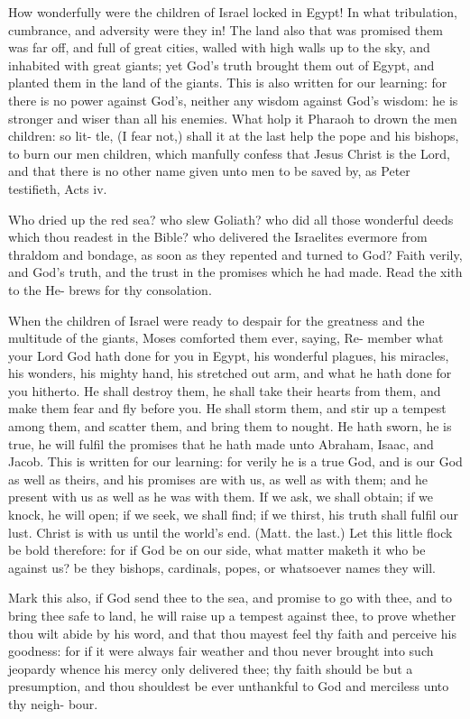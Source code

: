 \documentclass{custom}
\begin{document}
How wonderfully were the children of Israel 
locked in Egypt! In what tribulation, cumbrance, 
and adversity were they in! The land also that 
was promised them was far off, and full of great 
cities, walled with high walls up to the sky, and 
inhabited with great giants; yet God's truth 
brought them out of Egypt, and planted them in 
the land of the giants. This is also written for 
our learning: for there is no power against God's,
neither any wisdom against God's wisdom: he is 
stronger and wiser than all his enemies. What 
holp it Pharaoh to drown the men children: so lit-
tle, (I fear not,) shall it at the last help the pope 
and his bishops, to burn our men children, 
which manfully confess that Jesus Christ is the 
Lord, and that there is no other name given unto 
men to be saved by, as Peter testifieth, Acts iv. 

Who dried up the red sea? who slew Goliath? 
who did all those wonderful deeds which thou 
readest in the Bible? who delivered the Israelites 
evermore from thraldom and bondage, as soon as 
they repented and turned to God? Faith verily, 
and God's truth, and the trust in the promises 
which he had made. Read the xith to the He- 
brews for thy consolation. 

When the children of Israel were ready to 
despair for the greatness and the multitude of the 
giants, Moses comforted them ever, saying, Re- 
member what your Lord God hath done for you 
in Egypt, his wonderful plagues, his miracles,
his wonders, his mighty hand, his stretched out 
arm, and what he hath done for you hitherto. He 
shall destroy them, he shall take their hearts 
from them, and make them fear and fly before 
you. He shall storm them, and stir up a tempest 
among them, and scatter them, and bring them to 
nought. He hath sworn, he is true, he will fulfil 
the promises that he hath made unto Abraham, 
Isaac, and Jacob. This is written for our learning: 
for verily he is a true God, and is our God as
well as theirs, and his promises are with us, as
well as with them; and he present with us as well 
as he was with them. If we ask, we shall obtain; 
if we knock, he will open; if we seek, we shall 
find; if we thirst, his truth shall fulfil our lust. 
Christ is with us until the world's end. (Matt. 
the last.) Let this little flock be bold therefore: 
for if God be on our side, what matter maketh 
it who be against us? be they bishops, cardinals, 
popes, or whatsoever names they will.



Mark this also, if God send thee to the sea, 
and promise to go with thee, and to bring 
thee safe to land, he will raise up a tempest 
against thee, to prove whether thou wilt abide 
by his word, and that thou mayest feel thy 
faith and perceive his goodness: for if it 
were always fair weather and thou never 
brought into such jeopardy whence his mercy 
only delivered thee; thy faith should be but 
a presumption, and thou shouldest be ever 
unthankful to God and merciless unto thy neigh- 
bour.
\end{document}
